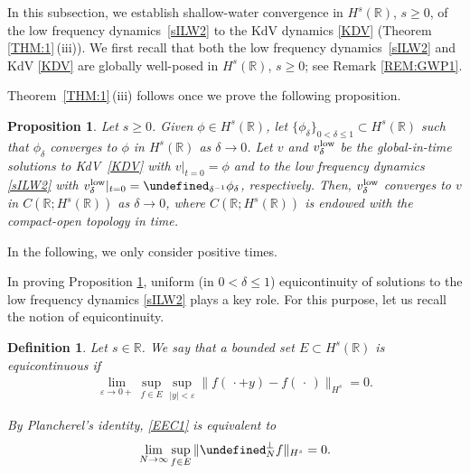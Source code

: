 \documentclass[letterpaper, 11pt,  reqno]{amsart}
\newtheorem{proposition}[theorem]{Proposition}
\newtheorem{definition}[theorem]{Definition}
\newcommand{\1}{\hspace{0.5mm}\textup{I}\hspace{0.5mm}}
\newcommand{\noi}{\noindent}
\newcommand{\R}{\mathbb{R}}
\let\P= \undefined
\newcommand{\P}{\mathbf{P}}
\newcommand{\low}{\textup{low}}
\newcommand{\dl}{\delta}
\newcommand{\eps}{\varepsilon}
\numberwithin{equation}{section}
\numberwithin{theorem}{section}
\begin{document}
In this subsection,  we establish 
shallow-water convergence in $H^s(\R)$, $s\ge 0$, 
of the low frequency dynamics~\eqref{sILW2}
to the KdV dynamics \eqref{KDV} (Theorem \ref{THM:1}\,(iii)).
We first recall that
both the low frequency dynamics~\eqref{sILW2}
and KdV \eqref{KDV}
are globally well-posed in $H^s(\R)$, $s \ge 0$; 
see
 Remark \ref{REM:GWP1}.

 Theorem~\ref{THM:1}\,(iii)
 follows once we prove the following proposition.




\begin{proposition}\label{PROP:conv1}
Let $s \ge 0$.
 Given $\phi \in H^s(\R)$, 
let $\{\phi_\dl\}_{0 < \dl \le 1} \subset H^s(\R)$
such that $\phi_\dl$ converges to $\phi$ in $H^s(\R)$ as $\dl \to 0$.
Let $v$ and $v_\dl^\low$
be the global-in-time solutions to KdV~\eqref{KDV} with $v|_{t = 0} = \phi$ and 
to the low frequency dynamics
\eqref{sILW2}
 with $v_\dl^\low|_{t = 0} = \P_{ \dl^{-1}} \phi_\dl$, 
 respectively.
Then, $v_\dl^\low$
converges to $v$ in $C(\R; H^s(\R))$
as $\dl \to 0$, 
where
$C(\R; H^s(\R))$ is endowed with the compact-open topology in time.


\end{proposition}


In the following, 
 we only consider positive times.

\medskip

In proving Proposition \ref{PROP:conv1}, 
uniform (in $0 < \dl \le 1$) equicontinuity 
of solutions to the low frequency dynamics \eqref{sILW2} plays a key role.
For this purpose, 
 let us recall the notion of equicontinuity.

\begin{definition}\label{DEF:EC}
\rm 
Let $s \in \R$.
We say that a bounded set $E \subset H^s(\R)$ is equicontinuous
if 
\begin{align}
 \lim_{\eps \to 0+} \sup_{f \in E} \sup_{|y|< \eps} 
\| f (\,\cdot + y) - f(\,\cdot\,)\|_{H^s} = 0.
\label{EEC1}
\end{align}


\noi
By Plancherel's identity, \eqref{EEC1} is equivalent to 
\begin{align*}
 \lim_{N\to \infty} \sup_{f \in E}
 \| \P_{N}^\perp f\|_{H^s} = 0.
\end{align*}


\end{definition}
\end{document}
